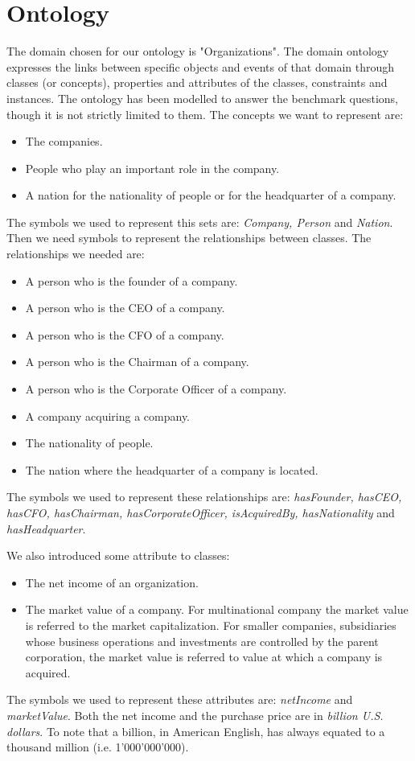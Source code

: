 \section{Ontology}
\label{sec:ontology}
The domain chosen for our ontology is "Organizations". The domain ontology expresses the links between specific objects and events of that domain through classes (or concepts), properties and attributes of the classes, constraints and instances. The ontology has been modelled to answer the benchmark questions, though it is not strictly limited to them.
The concepts we want to represent are:
\begin{itemize}
\item The companies.
\item People who play an important role in the company.
\item A nation for the nationality of people or for the headquarter of a company.
\end{itemize}
The symbols we used to represent this sets are: \textit{Company, Person} and \textit{Nation}.
Then we need symbols to represent the relationships between classes. The relationships we needed are:
\begin{itemize}
\item A person who is the founder of a company.
\item A person who is the CEO of a company.
\item A person who is the CFO of a company.
\item A person who is the Chairman of a company.
\item A person who is the Corporate Officer of a company.
\item A company acquiring a company.
\item The nationality of people.
\item The nation where the headquarter of a company is located.
\end{itemize}
The symbols we used to represent these relationships are: \textit{hasFounder, hasCEO, hasCFO, hasChairman, hasCorporateOfficer, isAcquiredBy, hasNationality} and \textit{hasHeadquarter}. 

We also introduced some attribute to classes:
\begin{itemize}
\item The net income of an organization.
\item The market value of a company. For multinational company the market value is referred to the market capitalization. For smaller companies, subsidiaries whose business operations and investments are controlled by the parent corporation, the market value is referred to value at which a company is acquired.
\end{itemize}
The symbols we used to represent these attributes are: \textit{ netIncome} and \textit{marketValue}.
Both the net income and the purchase price are in \textit{billion U.S. dollars}. To note that a billion, in American English, has always equated to a thousand million (i.e. 1'000'000'000).

